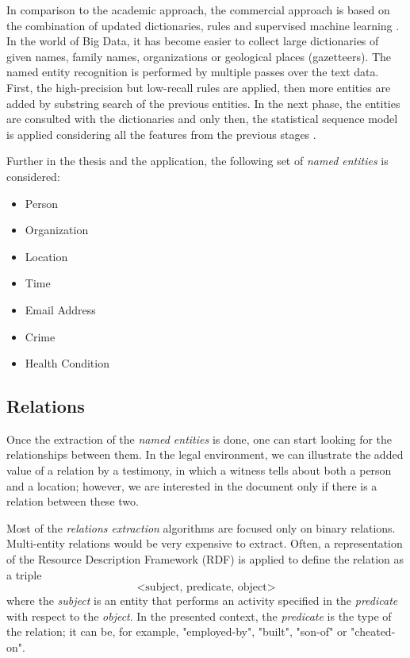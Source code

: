 \documentclass[
  digital, %
  notable,   %
  nolof,     %
  nolot,     %
]{fithesis3}
\begin{document}
In comparison to the academic approach, the commercial approach is based on the combination of updated dictionaries, rules and supervised machine learning \cite{chiticariu2013rule}.
In the world of Big Data, it has become easier to collect large dictionaries of given names, family names, organizations or geological places (gazetteers).
The named entity recognition is performed by multiple passes over the text data.
First, the high-precision but low-recall rules are applied, then more entities are added by substring search of the previous entities.
In the next phase, the entities are consulted with the dictionaries and only then, the statistical sequence model is applied considering all the features from the previous stages \cite[ch. 21]{jurafsky2014speech}.

Further in the thesis and the application, the following set of \textit{named entities} is considered:
\begin{itemize}
\item Person
\item Organization
\item Location
\item Time
\item Email Address
\item Crime
\item Health Condition
\end{itemize}

\subsection{Relations}
Once the extraction of the \textit{named entities} is done, one can start looking for the relationships between them.
In the legal environment, we can illustrate the added value of a relation by a testimony, in which a witness tells about both a person and a location; however, we are interested in the document only if there is a relation between these two.

Most of the \textit{relations extraction} algorithms are focused only on binary relations.
Multi-entity relations would be very expensive to extract.
Often, a representation of the Resource Description Framework (RDF)\cite{lassila1999resource} is applied to define the relation as a triple
$$
\text{<subject, predicate, object>}
$$
where the \textit{subject} is an entity that performs an activity specified in the \textit{predicate} with respect to the \textit{object}.
In the presented context, the \textit{predicate} is the type of the relation; it can be, for example, "employed-by", "built", "son-of" or "cheated-on".
\end{document}
